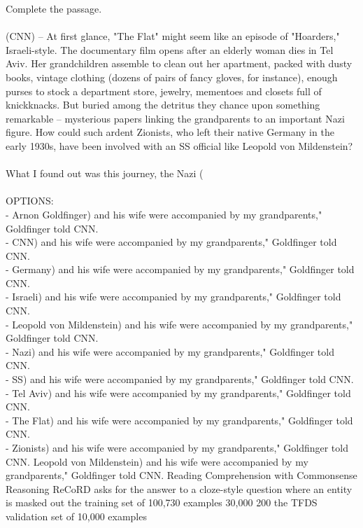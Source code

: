 \taskio
{Complete the passage.\\\\(CNN) -- At first glance, "The Flat" might seem like an episode of "Hoarders," Israeli-style. The documentary film opens after an elderly woman dies in Tel Aviv. Her grandchildren assemble to clean out her apartment, packed with dusty books, vintage clothing (dozens of pairs of fancy gloves, for instance), enough purses to stock a department store, jewelry, mementoes and closets full of knickknacks. But buried among the detritus they chance upon something remarkable -- mysterious papers linking the grandparents to an important Nazi figure. How could such ardent Zionists, who left their native Germany in the early 1930s, have been involved with an SS official like Leopold von Mildenstein?\\\\What I found out was this journey, the Nazi (\\\\OPTIONS:\\- Arnon Goldfinger) and his wife were accompanied by my grandparents," Goldfinger told CNN.\\- CNN) and his wife were accompanied by my grandparents," Goldfinger told CNN.\\- Germany) and his wife were accompanied by my grandparents," Goldfinger told CNN.\\- Israeli) and his wife were accompanied by my grandparents," Goldfinger told CNN.\\- Leopold von Mildenstein) and his wife were accompanied by my grandparents," Goldfinger told CNN.\\- Nazi) and his wife were accompanied by my grandparents," Goldfinger told CNN.\\- SS) and his wife were accompanied by my grandparents," Goldfinger told CNN.\\- Tel Aviv) and his wife were accompanied by my grandparents," Goldfinger told CNN.\\- The Flat) and his wife were accompanied by my grandparents," Goldfinger told CNN.\\- Zionists) and his wife were accompanied by my grandparents," Goldfinger told CNN.}
{Leopold von Mildenstein) and his wife were accompanied by my grandparents," Goldfinger told CNN.}
{
    \taskdescription
    {Reading Comprehension with Commonsense Reasoning} %
    {ReCoRD} %
    {\citep{DBLP:journals/corr/abs-1810-12885}} %
    {asks for the answer to a cloze-style question where an entity is masked out} %
    {the training set of 100,730 examples} %
    {30,000} %
    {200} %
    {the TFDS validation set of 10,000 examples} %
}

